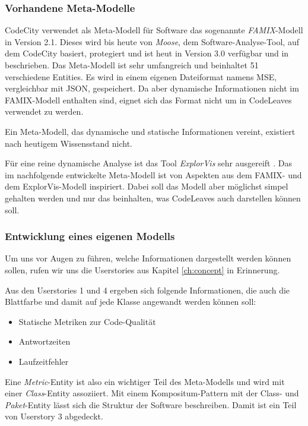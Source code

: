 \subsubsection*{Vorhandene Meta-Modelle}

CodeCity verwendet als Meta-Modell für Software das sogenannte \textit{FAMIX}-Modell in Version 2.1. Dieses wird bis heute von \textit{Moose}, dem Software-Analyse-Tool, auf dem CodeCity basiert, protegiert und ist heut in Version 3.0 verfügbar und in \cite{merrill1916moose} beschrieben. Das Meta-Modell ist sehr umfangreich und beinhaltet 51 verschiedene Entities. Es wird in einem eigenen Dateiformat namens MSE, vergleichbar mit JSON, gespeichert. Da aber dynamische Informationen nicht im FAMIX-Modell enthalten sind, eignet sich das Format nicht um in CodeLeaves verwendet zu werden.

Ein Meta-Modell, das dynamische und statische Informationen vereint, existiert nach heutigem Wissensstand nicht.

Für eine reine dynamische Analyse ist das Tool \textit{ExplorVis} sehr ausgereift \cite{fittkau2017software}. Das im nachfolgende entwickelte Meta-Modell ist von Aspekten aus dem FAMIX- und dem ExplorVis-Modell inspiriert. Dabei soll das Modell aber möglichst simpel gehalten werden und nur das beinhalten, was CodeLeaves auch darstellen können soll.

\subsubsection*{Entwicklung eines eigenen Modells}

Um uns vor Augen zu führen, welche Informationen dargestellt werden können sollen, rufen wir uns die Userstories aus Kapitel \ref{ch:concept} in Erinnerung.

Aus den Userstories 1 und 4 ergeben sich folgende Informationen, die auch die Blattfarbe und damit auf jede Klasse angewandt werden können soll:

\begin{itemize}
  \item Statische Metriken zur Code-Qualität
  \item Antwortzeiten
  \item Laufzeitfehler
\end{itemize}

Eine \textit{Metric}-Entity ist also ein wichtiger Teil des Meta-Modells und wird mit einer \textit{Class}-Entity assoziiert. Mit einem Kompositum-Pattern mit der Class- und \textit{Paket}-Entity lässt sich die Struktur der Software beschreiben. Damit ist ein Teil von Userstory 3 abgedeckt.

